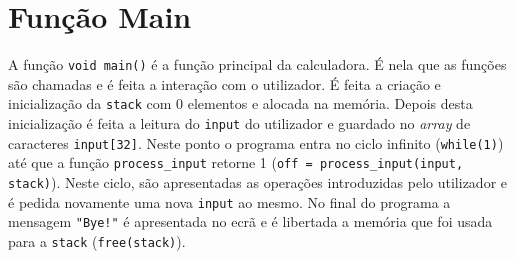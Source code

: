\documentclass[12pt, a4paper]{article}
\begin{document}
    \section{Função Main}
        A função \texttt{void main()} é a função principal da calculadora. É nela que as funções são chamadas e é feita a interação com o utilizador. É feita a criação e inicialização da \texttt{stack} com 0 elementos e alocada na memória. Depois desta inicialização é feita a leitura do \texttt{input} do utilizador e guardado no \textit{array} de caracteres \texttt{input[32]}. Neste ponto o programa entra no ciclo infinito (\texttt{while(1)}) até que a função \texttt{process\_input} retorne 1 (\texttt{off = process\_input(input, stack)}). Neste ciclo, são apresentadas as operações introduzidas pelo utilizador e é pedida novamente uma nova \texttt{input} ao mesmo. No final do programa a mensagem \texttt{"Bye!"} é apresentada no ecrã e é libertada a memória que foi usada para a \texttt{stack} (\texttt{free(stack)}).
    
\end{document}
